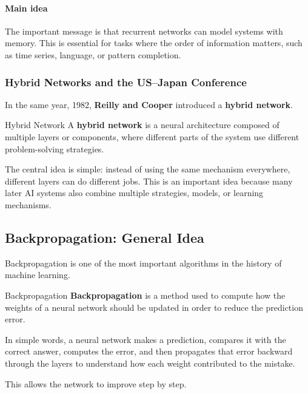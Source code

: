 \documentclass[11pt]{article}
\theoremstyle{smallexample}
\begin{document}
\paragraph{Main idea}
The important message is that recurrent networks can model systems with memory. This is essential for tasks where the order of information matters, such as time series, language, or pattern completion.

\subsubsection{Hybrid Networks and the US--Japan Conference}

In the same year, 1982, \textbf{Reilly and Cooper} introduced a \textbf{hybrid network}.

\begin{defbox}{Hybrid Network}
A \textbf{hybrid network} is a neural architecture composed of multiple layers or components, where different parts of the system use different problem-solving strategies.
\end{defbox}

The central idea is simple: instead of using the same mechanism everywhere, different layers can do different jobs. This is an important idea because many later AI systems also combine multiple strategies, models, or learning mechanisms.



\subsection{Backpropagation: General Idea}

Backpropagation is one of the most important algorithms in the history of machine learning.

\begin{defbox}{Backpropagation}
\textbf{Backpropagation} is a method used to compute how the weights of a neural network should be updated in order to reduce the prediction error.
\end{defbox}

In simple words, a neural network makes a prediction, compares it with the correct answer, computes the error, and then propagates that error backward through the layers to understand how each weight contributed to the mistake.

This allows the network to improve step by step.
\end{document}
